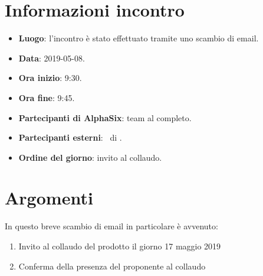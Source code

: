 \newcommand{\documento}{\VE}
\newcommand{\nomedocumentofisico}{VE\_2019-05-08.pdf}
\newcommand{\redazione}{\NC}
\newcommand{\verifica}{\CV}
\newcommand{\approvazione}{\TG}
\newcommand{\versione}{1.0.0}
\newcommand{\uso}{Esterno}
\newcommand{\destinateTo}{\TV, \\ & \RC, \\ & \II}
\newcommand{\datacreazione}{9 maggio 2019}
\newcommand{\datamodifica}{10 maggio 2019}
\newcommand{\stato}{Approvato}

\def\TABELLE{false}	%
\def\FIGURE{false} 	%






    

    

    \section{Informazioni incontro}
    	\begin{itemize}
    		\item \textbf{Luogo}: l'incontro è stato effettuato tramite uno scambio di email.
    		\item \textbf{Data}: 2019-05-08.
    		\item \textbf{Ora inizio}: 9:30.
    		\item \textbf{Ora fine}: 9:45.
    		\item \textbf{Partecipanti di AlphaSix}: team al completo.
    		\item \textbf{Partecipanti esterni}: \LuC~di \II.
    		\item \textbf{Ordine del giorno}: invito al collaudo.

    	\end{itemize}

    \section{Argomenti}
    In questo breve scambio di email in particolare è avvenuto:
    \begin{enumerate}
        \item Invito al collaudo del prodotto il giorno 17 maggio 2019
        \item Conferma della presenza del proponente \LuC al collaudo
    \end{enumerate}

